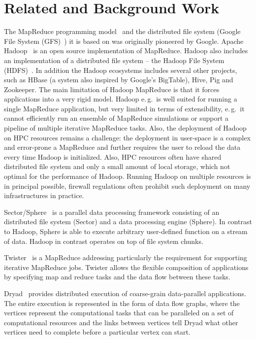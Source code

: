 \documentclass{acm_proc_article-sp}
\begin{document}
\section{Related and Background Work}
\label{sec:related_work}
The MapReduce programming model~\cite{Dean:2004:MSD:1251254.1251264}
and the distributed file system (Google File System
(GFS)~\cite{Ghemawat:2003:GFS:1165389.945450}) it is based on was
originally pioneered by Google. Apache Hadoop~\cite{hadoop} is an open
source implementation of MapReduce. Hadoop also includes an
implementation of a distributed file system -- the Hadoop File System
(HDFS)~\cite{Borthakur:2007fk}. In addition the Hadoop ecosystems
includes several other projects, such as HBase (a system also inspired
by Google's BigTable), Hive, Pig and Zookeeper. The main limitation of
Hadoop MapReduce is that it forces applications into a very rigid
model. Hadoop e.\,g.\ is well suited for running a single MapReduce
application, but very limited in terms of extensibility, e.\,g.\ it
cannot efficiently run an ensemble of MapReduce simulations or support
a pipeline of multiple iterative MapReduce tasks. Also, the deployment of Hadoop 
on HPC resources remains a challenge: the deployment in user-space is a complex 
and error-prone a MapReduce and further requires the user to reload the data 
every time Hadoop is initialized. Also, HPC resources often have shared 
distributed file system and only a small amount of local storage, which 
not optimal for the performance of Hadoop. Running Hadoop on multiple resources 
is in principal possible, firewall regulations often prohibit such deployment on 
many infrastructures in practice.

Sector/Sphere~\cite{Gu_Grossman_2009} is a parallel data processing framework
consisting of an distributed file system (Sector) and a data processing engine
(Sphere). In contrast to Hadoop, Sphere is able to execute arbitrary 
user-defined function on a stream of data. Hadoop in contrast operates on top 
of file system chunks.

Twister~\cite{Ekanayake:2010:TRI:1851476.1851593} is a 
MapReduce addressing particularly the requirement for supporting iterative 
MapReduce jobs. Twister allows the flexible composition of applications by 
specifying map and reduce tasks and the data flow between these tasks. 

Dryad~\cite{Isard:2007:DDD:1272998.1273005} provides distributed execution of
coarse-grain data-parallel applications. The entire execution is represented in
the form of data flow graphs, where the vertices represent the computational
tasks that can be paralleled on a set of computational resources and the links
between vertices tell Dryad what other vertices need to complete before a
particular vertex can start.
\end{document}
